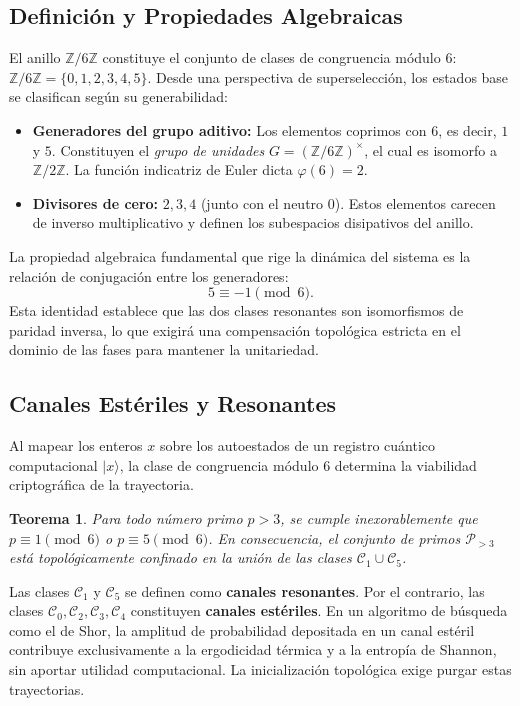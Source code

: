 \documentclass[12pt,a4paper]{article}
\theoremstyle{plain}
\newtheorem{teorema}{Teorema}[section]
\theoremstyle{definition}
\theoremstyle{remark}
\begin{document}
\subsection{Definición y Propiedades Algebraicas}

El anillo $\mathbb{Z}/6\mathbb{Z}$ constituye el conjunto de clases de congruencia módulo 6: $\mathbb{Z}/6\mathbb{Z} = \{0,1,2,3,4,5\}$. Desde una perspectiva de superselección, los estados base se clasifican según su generabilidad:
\begin{itemize}
    \item \textbf{Generadores del grupo aditivo:} Los elementos coprimos con 6, es decir, $1$ y $5$. Constituyen el \textit{grupo de unidades} $G = (\mathbb{Z}/6\mathbb{Z})^{\times}$, el cual es isomorfo a $\mathbb{Z}/2\mathbb{Z}$. La función indicatriz de Euler dicta $\varphi(6)=2$.
    \item \textbf{Divisores de cero:} $2,3,4$ (junto con el neutro $0$). Estos elementos carecen de inverso multiplicativo y definen los subespacios disipativos del anillo.
\end{itemize}

La propiedad algebraica fundamental que rige la dinámica del sistema es la relación de conjugación entre los generadores:
\begin{equation}
5 \equiv -1 \pmod{6}.
\label{eq:inverso_aditivo}
\end{equation}
Esta identidad establece que las dos clases resonantes son isomorfismos de paridad inversa, lo que exigirá una compensación topológica estricta en el dominio de las fases para mantener la unitariedad.

\subsection{Canales Estériles y Resonantes}

Al mapear los enteros $x$ sobre los autoestados de un registro cuántico computacional $|x\rangle$, la clase de congruencia módulo 6 determina la viabilidad criptográfica de la trayectoria. 

\begin{teorema}
Para todo número primo $p>3$, se cumple inexorablemente que $p \equiv 1 \pmod{6}$ o $p \equiv 5 \pmod{6}$. En consecuencia, el conjunto de primos $\mathcal{P}_{>3}$ está topológicamente confinado en la unión de las clases $\mathcal{C}_1 \cup \mathcal{C}_5$.
\end{teorema}

Las clases $\mathcal{C}_1$ y $\mathcal{C}_5$ se definen como \textbf{canales resonantes}. Por el contrario, las clases $\mathcal{C}_0,\mathcal{C}_2,\mathcal{C}_3,\mathcal{C}_4$ constituyen \textbf{canales estériles}. En un algoritmo de búsqueda como el de Shor, la amplitud de probabilidad depositada en un canal estéril contribuye exclusivamente a la ergodicidad térmica y a la entropía de Shannon, sin aportar utilidad computacional. La inicialización topológica exige purgar estas trayectorias.
\end{document}
